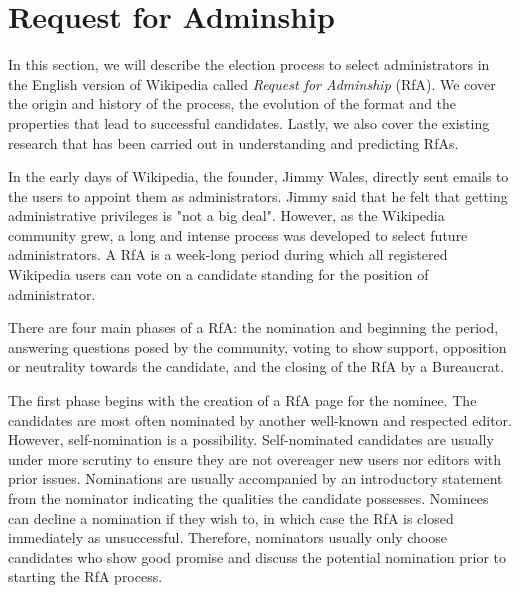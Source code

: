 \section{Request for Adminship}
\label{sec:rfa}
In this section, we will describe the election process to select administrators in the English version of Wikipedia called \textit{Request for Adminship} (RfA). We cover the origin and history of the process, the evolution of the format and the properties that lead to successful candidates. Lastly, we also cover the existing research that has been carried out in understanding and predicting RfAs.

In the early days of Wikipedia, the founder, Jimmy Wales, directly sent emails to the users to appoint them as administrators. Jimmy said that he felt that getting administrative privileges is "not a big deal". However, as the Wikipedia community grew, a long and intense process was developed to select future administrators. A RfA is a week-long period during which all registered Wikipedia users can vote on a candidate standing for the position of administrator. 

There are four main phases of a RfA: the nomination and beginning the period, answering questions posed by the community, voting to show support, opposition or neutrality towards the candidate, and the closing of the RfA by a Bureaucrat.

The first phase begins with the creation of a RfA page for the nominee. The candidates are most often nominated by another well-known and respected editor. However, self-nomination is a possibility. Self-nominated candidates are usually under more scrutiny to ensure they are not overeager new users nor editors with prior issues. Nominations are usually accompanied by an introductory statement from the nominator indicating the qualities the candidate possesses. Nominees can decline a nomination if they wish to, in which case the RfA is closed immediately as unsuccessful. Therefore, nominators usually only choose candidates who show good promise and discuss the potential nomination prior to starting the RfA process. 

